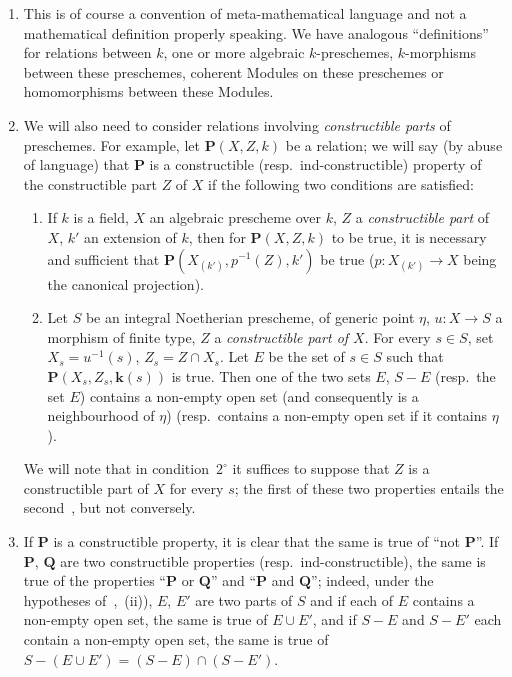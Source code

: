 \begin{remarks}[9.2.2]
\label{IV.9.2.2}
\begin{enumerate}[label=(\roman*)]
  \item This is of course a convention of meta-mathematical language and not a mathematical definition properly speaking.
We have analogous ``definitions'' for relations between $k$, one or more algebraic $k$-preschemes, $k$-morphisms between these preschemes, coherent Modules on these preschemes or homomorphisms between these Modules.
  \item We will also need to consider relations involving \emph{constructible parts} of preschemes.
For example, let $\mathbf{P}(X,Z,k)$ be a relation; we will say (by abuse of language) that $\mathbf{P}$ is a constructible (resp.\ ind-constructible) property of the constructible part $Z$ of $X$ if the following two conditions are satisfied:
\begin{enumerate}[label=$\arabic*^{\mathrm{o}}$]
  \item If $k$ is a field, $X$ an algebraic prescheme over $k$, $Z$ a \emph{constructible part} of $X$, $k'$ an extension of $k$, then for $\mathbf{P}(X,Z,k)$ to be true, it is necessary and sufficient that $\mathbf{P}(X_{(k')},p^{-1}(Z),k')$ be true ($p:X_{(k')}\to X$ being the canonical projection).
  \item Let $S$ be an integral Noetherian prescheme, of generic point $\eta$, $u:X\to S$ a morphism of finite type, $Z$ a \emph{constructible part of $X$}.
For every $s\in S$, set $X_s=u^{-1}(s)$, $Z_s=Z\cap X_s$.
Let $E$ be the set of $s\in S$ such that $\mathbf{P}(X_s,Z_s,\mathbf{k}(s))$ is true.
Then one of the two sets $E$, $S-E$ (resp.\ the set $E$) contains a non-empty open set (and consequently is a neighbourhood of $\eta$) (resp.\ contains a non-empty open set if it contains $\eta$).
\end{enumerate}

We will note that in condition~$2^\circ$ it suffices to suppose that $Z$ is a constructible part of $X$ for every $s$; the first of these two properties entails the second~, but not conversely.

  \item If $\mathbf{P}$ is a constructible property, it is clear that the same is true of ``not $\mathbf{P}$''.
If $\mathbf{P}$, $\mathbf{Q}$ are two constructible properties (resp.\ ind-constructible), the same is true of the properties ``$\mathbf{P}$ or $\mathbf{Q}$'' and ``$\mathbf{P}$ and $\mathbf{Q}$''; indeed, under the hypotheses of~,~(ii)), $E$, $E'$ are two parts of $S$ and if each of $E$ contains a non-empty open set, the same is true of $E\cup E'$, and if $S-E$ and $S-E'$ each contain a non-empty open set, the same is true of $S-(E\cup E')=(S-E)\cap(S-E')$.


\end{enumerate}
\end{remarks}
